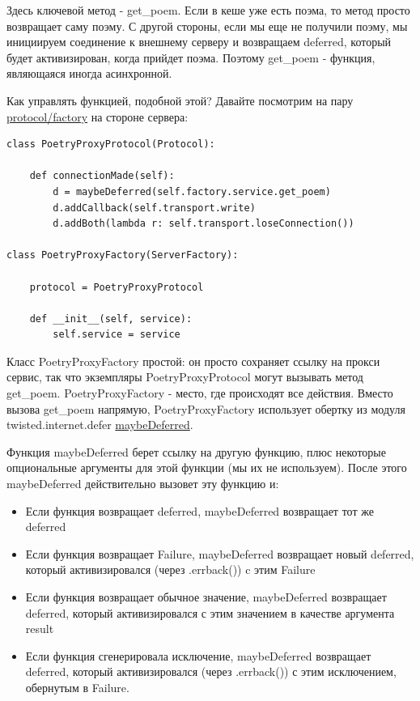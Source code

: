 Здесь ключевой метод - get\_poem. Если в кеше уже есть поэма, 
то метод просто возвращает саму поэму. С другой стороны, 
если мы еще не получили поэму, мы инициируем соединение 
к внешнему серверу и возвращаем deferred, который будет активизирован, 
когда прийдет поэма. Поэтому get\_poem - функция, являющаяся 
иногда асинхронной.

Как управлять функцией, подобной этой? Давайте посмотрим на пару 
\href{http://github.com/jdavisp3/twisted-intro/blob/master/twisted-server-1/poetry-proxy.py#L52}{protocol/factory} на стороне сервера:

\begin{scriptsize}\begin{verbatim}
class PoetryProxyProtocol(Protocol):

    def connectionMade(self):
        d = maybeDeferred(self.factory.service.get_poem)
        d.addCallback(self.transport.write)
        d.addBoth(lambda r: self.transport.loseConnection())

class PoetryProxyFactory(ServerFactory):

    protocol = PoetryProxyProtocol

    def __init__(self, service):
        self.service = service
\end{verbatim}\end{scriptsize}


Класс PoetryProxyFactory простой: он просто сохраняет 
ссылку на прокси сервис, так что экземпляры PoetryProxyProtocol 
могут вызывать метод get\_poem. PoetryProxyFactory - место, где 
происходят все действия. Вместо вызова get\_poem напрямую, 
PoetryProxyFactory использует обертку из модуля twisted.internet.defer 
\href{http://twistedmatrix.com/trac/browser/tags/releases/twisted-8.2.0/twisted/internet/defer.py#L84}{maybeDeferred}.


Функция maybeDeferred берет ссылку на другую функцию, 
плюс некоторые опциональные аргументы для этой 
функции (мы их не используем). После этого maybeDeferred 
действительно вызовет эту функцию и:

\begin{itemize}

\item Если функция возвращает deferred, maybeDeferred 
возвращает тот же deferred

\item Если функция возвращает Failure, maybeDeferred 
возвращает новый deferred, который активизировался (через 
.errback()) c этим Failure

\item Если функция возвращает обычное значение, maybeDeferred 
возвращает deferred, который активизировался с этим значением в 
качестве аргумента result

\item Если функция сгенерировала исключение, maybeDeferred 
возвращает deferred, который активизировался (через .errback()) с 
этим исключением, обернутым в Failure.

\end{itemize}


